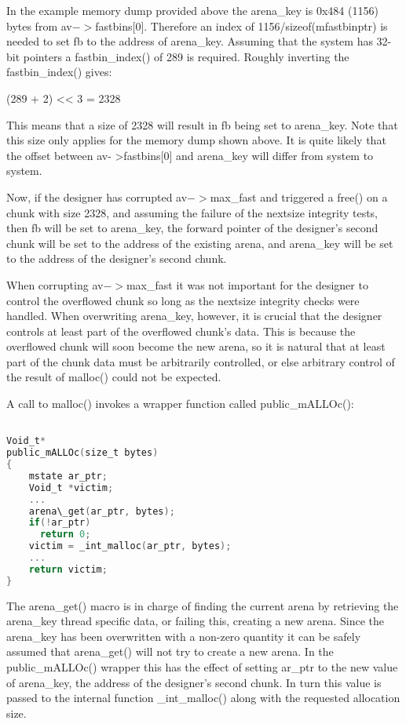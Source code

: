 \documentclass[12pt]{article}
\begin{document}
In the example memory dump provided above the arena\_key is 0x484
(1156) bytes from av$->$fastbins[0]. Therefore an index of
1156/sizeof(mfastbinptr) is needed to set fb to the address of
arena\_key. Assuming that the system has 32-bit pointers a
fastbin\_index() of 289 is required. Roughly inverting the
fastbin\_index() gives:

          (289 + 2) << 3 = 2328

This means that a size of 2328 will result in fb being set to
arena\_key. Note that this size only applies for the memory dump
shown above. It is quite likely that the offset between av-
>fastbins[0] and arena\_key will differ from system to system.

Now, if the designer has corrupted av$->$max\_fast and triggered a
free() on a chunk with size 2328, and assuming the failure of the
nextsize integrity tests, then fb will be set to arena\_key, the
forward pointer of the designer's second chunk will be set to the
address of the existing arena, and arena\_key will be set to the
address of the designer's second chunk.

When corrupting av$->$max\_fast it was not important for the designer
to control the overflowed chunk so long as the nextsize integrity
checks were handled. When overwriting arena\_key, however, it is
crucial that the designer controls at least part of the overflowed
chunk's data. This is because the overflowed chunk will soon become
the new arena, so it is natural that at least part of the chunk
data must be arbitrarily controlled, or else arbitrary control of
the result of malloc() could not be expected.

A call to malloc() invokes a wrapper function called
public\_mALLOc():
\begin{lstlisting}[language=C]

Void_t*
public_mALLOc(size_t bytes)
{
    mstate ar_ptr;
    Void_t *victim;
    ...
    arena\_get(ar_ptr, bytes);
    if(!ar_ptr)
      return 0;
    victim = _int_malloc(ar_ptr, bytes);
    ...
    return victim;
}
\end{lstlisting}
The arena\_get() macro is in charge of finding the current arena by
retrieving the arena\_key thread specific data, or failing this,
creating a new arena. Since the arena\_key has been overwritten with
a non-zero quantity it can be safely assumed that arena\_get() will
not try to create a new arena. In the public\_mALLOc() wrapper this
has the effect of setting ar\_ptr to the new value of arena\_key, the
address of the designer's second chunk. In turn this value is
passed to the internal function \_int\_malloc() along with the
requested allocation size.
\end{document}

